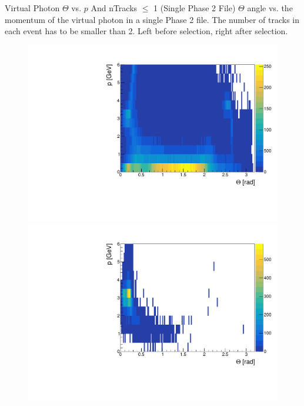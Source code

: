 \documentclass[10pt]{beamer}
\begin{document}
\begin{frame}{Virtual Photon $\Theta$ vs. $p$ And nTracks $\leq$ 1 (Single Phase 2 File)}
	$\Theta$ angle vs. the momentum of the virtual photon in a single Phase 2 file. The number of tracks in each event has to be smaller than 2. Left before selection, right after selection.
	
	\begin{figure}
		\centering
		\begin{minipage}{.5\textwidth}
			\centering
			\includegraphics[width=\textwidth]{gg/data/ThetaMgg_BS_nT1}
			
		\end{minipage}%
		\begin{minipage}{.5\textwidth}
			\centering
			\includegraphics[width=\textwidth]{gg/data/ThetaMgg_AS_nT1}
			
		\end{minipage}
	\end{figure}
	
	
	
\end{frame}
\end{document}
